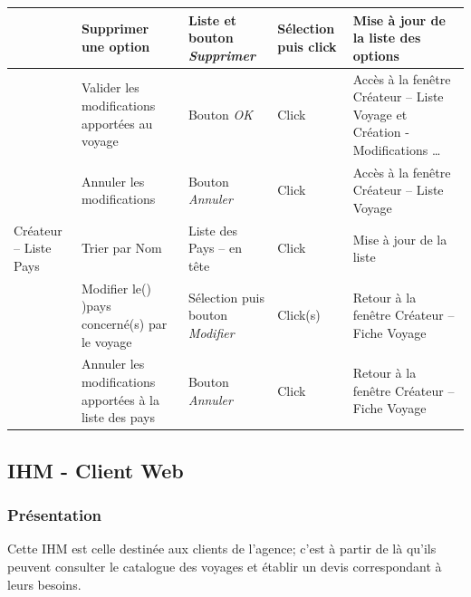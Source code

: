 \documentclass[11pt]{article}
\begin{document}
\begin{center}
\begin{footnotesize}
\begin{supertabular}{|p{2cm}|p{3cm}|p{3.5cm}|p{2cm}|p{4cm}|}
 & Supprimer une option & Liste et bouton \emph{Supprimer} & Sélection puis click & Mise à jour de la  liste des options \\ \hline
 & Valider les modifications apportées au voyage & Bouton \emph{OK} & Click & Accès à la fenêtre Créateur – Liste Voyage et Création - Modifications \ldots \\ \hline
 & Annuler les modifications & Bouton \emph{Annuler} & Click & Accès à la fenêtre Créateur – Liste Voyage \\ \hline
Créateur – Liste Pays & Trier par Nom & Liste des Pays – en tête & Click & Mise à jour de la liste \\ \hline
 & Modifier le() )pays concerné(s) par le voyage & Sélection puis bouton \emph{Modifier} & Click(s) & Retour à la fenêtre Créateur – Fiche Voyage \\ \hline
 & Annuler les modifications apportées à la liste des pays & Bouton \emph{Annuler} & Click & Retour à la fenêtre Créateur – Fiche Voyage \\ 
 \hline
\end{supertabular}
\end{footnotesize}
\end{center}

\subsection{IHM - Client Web}
\subsubsection{Présentation}
Cette IHM est celle destinée aux clients de l'agence; c'est à partir de là qu'ils peuvent consulter le catalogue des voyages et établir un devis correspondant à leurs besoins.
\end{document}
